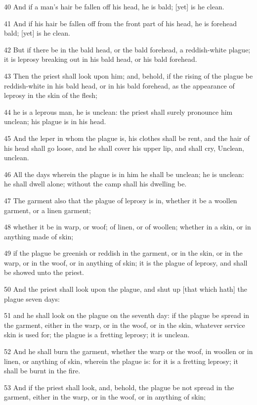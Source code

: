 \par 40 And if a man's hair be fallen off his head, he is bald; [yet] is he clean.
\par 41 And if his hair be fallen off from the front part of his head, he is forehead bald; [yet] is he clean.
\par 42 But if there be in the bald head, or the bald forehead, a reddish-white plague; it is leprosy breaking out in his bald head, or his bald forehead.
\par 43 Then the priest shall look upon him; and, behold, if the rising of the plague be reddish-white in his bald head, or in his bald forehead, as the appearance of leprosy in the skin of the flesh;
\par 44 he is a leprous man, he is unclean: the priest shall surely pronounce him unclean; his plague is in his head.
\par 45 And the leper in whom the plague is, his clothes shall be rent, and the hair of his head shall go loose, and he shall cover his upper lip, and shall cry, Unclean, unclean.
\par 46 All the days wherein the plague is in him he shall be unclean; he is unclean: he shall dwell alone; without the camp shall his dwelling be.
\par 47 The garment also that the plague of leprosy is in, whether it be a woollen garment, or a linen garment;
\par 48 whether it be in warp, or woof; of linen, or of woollen; whether in a skin, or in anything made of skin;
\par 49 if the plague be greenish or reddish in the garment, or in the skin, or in the warp, or in the woof, or in anything of skin; it is the plague of leprosy, and shall be showed unto the priest.
\par 50 And the priest shall look upon the plague, and shut up [that which hath] the plague seven days:
\par 51 and he shall look on the plague on the seventh day: if the plague be spread in the garment, either in the warp, or in the woof, or in the skin, whatever service skin is used for; the plague is a fretting leprosy; it is unclean.
\par 52 And he shall burn the garment, whether the warp or the woof, in woollen or in linen, or anything of skin, wherein the plague is: for it is a fretting leprosy; it shall be burnt in the fire.
\par 53 And if the priest shall look, and, behold, the plague be not spread in the garment, either in the warp, or in the woof, or in anything of skin;

